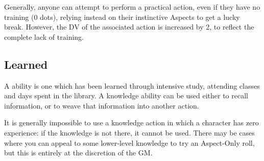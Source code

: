 Generally, anyone can attempt to perform a practical action, even if they have no training (0 dots), relying instead on their instinctive Aspects to get a lucky break. However, the DV of the associated action is increased by 2, to reflect the complete lack of training. 
 
\abilityTable
{
}

\subsection{Learned}

A  ability is one which has been learned through intensive study, attending classes and days spent in the library. A knowledge ability can be used either to recall information, or to weave that information into another action. 

It is generally impossible to use a knowledge action in which a character has zero experience: if the knowledge is not there, it cannot be used. There may be cases where you can appeal to some lower-level knowledge to try an Aspect-Only roll, but this is entirely at the discretion of the GM.
	
